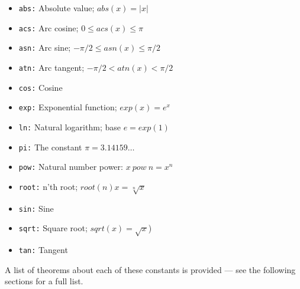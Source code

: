 \begin{itemize}

\item{\tt abs:} Absolute value; $abs(x) = |x|$

\item{\tt acs:} Arc cosine; $0 \leq acs(x) \leq \pi$

\item{\tt asn:} Arc sine; $- \pi/2 \leq asn(x) \leq \pi/2$

\item{\tt atn:} Arc tangent; $ - \pi/2 < atn(x) < \pi/2$

\item{\tt cos:} Cosine

\item{\tt exp:} Exponential function; $exp(x) = e^x$

\item{\tt ln:} Natural logarithm; base $e = exp(1)$

\item{\tt pi:} The constant $\pi = 3.14159\ldots$

\item{\tt pow:} Natural number power: $x\ pow\ n = x^n$

\item{\tt root:} n'th root; $root(n) x = \sqrt[n]{x}$

\item{\tt sin:} Sine

\item{\tt sqrt:} Square root; $sqrt(x) = \sqrt{x}$)

\item{\tt tan:} Tangent

\end{itemize}

A list of theorems about each of these constants is provided --- see the
following sections for a full list.
